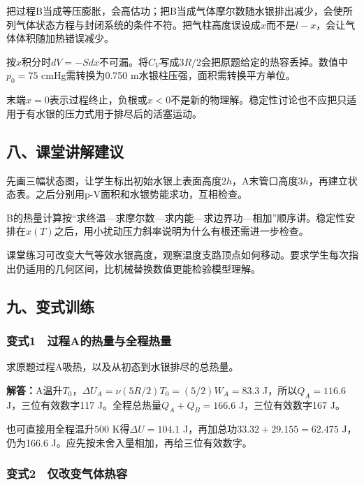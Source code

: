 \documentclass[12pt,a4paper,fontset=fandol]{ctexart}
\begin{document}
把过程B当成等压膨胀，会高估功；把B当成气体摩尔数随水银排出减少，会使所列气体状态方程与封闭系统的条件不符。把气柱高度误设成\(x\)而不是\(l-x\)，会让气体体积随加热错误减少。

按\(x\)积分时\(dV=-Sdx\)不可漏。将\(C_V\)写成\(3R/2\)会把原题给定的热容丢掉。数值中\(p_0=75\)
cmHg需转换为0.750 m水银柱压强，面积需转换平方单位。

末端\(x=0\)表示过程终止，负根或\(x<0\)不是新的物理解。稳定性讨论也不应把只适用于有水银的压力式用于排尽后的活塞运动。

\subsection{八、课堂讲解建议}\label{ux516bux8bfeux5802ux8bb2ux89e3ux5efaux8bae-1}

先画三幅状态图，让学生标出初始水银上表面高度\(2h\)，A末管口高度\(3h\)，再建立状态表。之后分别用p-V面积和水银势能求功，互相检查。

B的热量计算按``求终温---求摩尔数---求内能---求边界功---相加''顺序讲。稳定性安排在\(x(T)\)之后，用小扰动压力斜率说明为什么有根还需进一步检查。

课堂练习可改变大气等效水银高度，观察温度支路顶点如何移动。要求学生每次指出仍适用的几何区间，比机械替换数值更能检验模型理解。

\subsection{九、变式训练}\label{ux4e5dux53d8ux5f0fux8badux7ec3-1}

\subsubsection{变式1　过程A的热量与全程热量}\label{ux53d8ux5f0f1-ux8fc7ux7a0baux7684ux70edux91cfux4e0eux5168ux7a0bux70edux91cf}

求原题过程A吸热，以及从初态到水银排尽的总热量。

\textbf{解答：}A温升\(T_0\)，\(\Delta U_A=\nu(5R/2)T_0=(5/2)W_A=83.3\)
J，所以\(Q_A=116.6\) J，三位有效数字117 J。全程总热量\(Q_A+Q_B=166.6\)
J，三位有效数字167 J。

也可直接用全程温升500 K得\(\Delta U=104.1\)
J，再加总功\(33.32+29.155=62.475\) J，仍为166.6
J。应先按未舍入量相加，再给三位有效数字。

\subsubsection{变式2　仅改变气体热容}\label{ux53d8ux5f0f2-ux4ec5ux6539ux53d8ux6c14ux4f53ux70edux5bb9}
\end{document}
